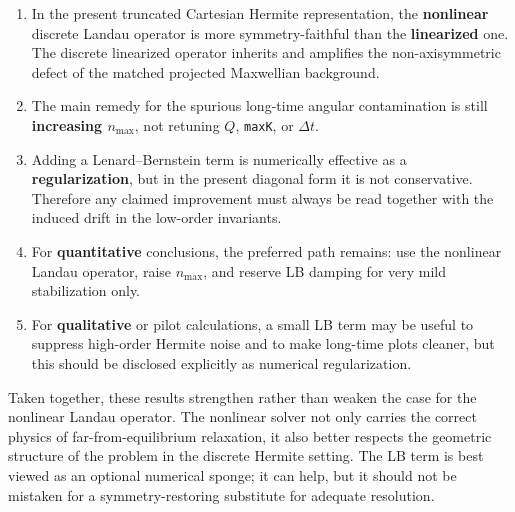 \documentclass[11pt]{article}
\begin{document}
\begin{enumerate}[leftmargin=1.5em]
    \item In the present truncated Cartesian Hermite representation, the \textbf{nonlinear} discrete Landau operator is more symmetry-faithful than the \textbf{linearized} one.
    The discrete linearized operator inherits and amplifies the non-axisymmetric defect of the matched projected Maxwellian background.
    \item The main remedy for the spurious long-time angular contamination is still \textbf{increasing $n_{\max}$}, not retuning \(Q\), \texttt{maxK}, or \(\Delta t\).
    \item Adding a Lenard--Bernstein term is numerically effective as a \textbf{regularization}, but in the present diagonal form it is not conservative.
    Therefore any claimed improvement must always be read together with the induced drift in the low-order invariants.
    \item For \textbf{quantitative} conclusions, the preferred path remains: use the nonlinear Landau operator, raise \(n_{\max}\), and reserve LB damping for very mild stabilization only.
    \item For \textbf{qualitative} or pilot calculations, a small LB term may be useful to suppress high-order Hermite noise and to make long-time plots cleaner, but this should be disclosed explicitly as numerical regularization.
\end{enumerate}

Taken together, these results strengthen rather than weaken the case for the nonlinear Landau operator.
The nonlinear solver not only carries the correct physics of far-from-equilibrium relaxation, it also better respects the geometric structure of the problem in the discrete Hermite setting.
The LB term is best viewed as an optional numerical sponge; it can help, but it should not be mistaken for a symmetry-restoring substitute for adequate resolution.
\end{document}
